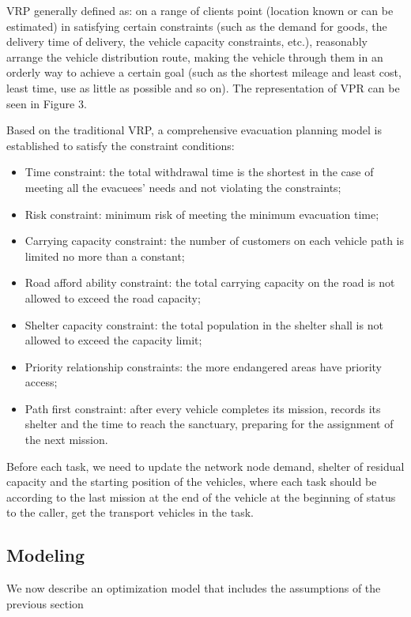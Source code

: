 \documentclass{mcmthesis}
\begin{document}
VRP \cite{Dikas2016Solving,He2015Model} generally defined as: on a range of clients point (location known or can be estimated) in satisfying certain constraints (such as the demand for goods, the delivery time of delivery, the vehicle capacity constraints, etc.), reasonably arrange the vehicle distribution route, making the vehicle through them in an orderly way to achieve a certain goal (such as the shortest mileage and least cost, least time, use as little as possible and so on). The representation of VPR can be seen in Figure 3.


Based on the traditional VRP, a comprehensive evacuation planning model is established to satisfy the constraint conditions:
\begin{itemize}
  \item Time constraint: the total withdrawal time is the shortest in the case of meeting all the evacuees' needs and not violating the constraints;
  \item Risk constraint: minimum risk of meeting the minimum evacuation time;
  \item Carrying capacity constraint: the number of customers on each vehicle path is limited no more than a constant;
  \item Road afford ability constraint: the total carrying capacity on the road is not allowed to exceed the road capacity;
  \item Shelter capacity constraint: the total population in the shelter shall is not allowed to exceed the capacity limit;
  \item Priority relationship constraints: the more endangered areas have priority access;
  \item Path first constraint: after every vehicle completes its mission, records its shelter and the time to reach the sanctuary, preparing for the assignment of the next mission.
\end{itemize}

Before each task, we need to update the network node demand, shelter of residual capacity and the starting position of the vehicles, where each task should be according to the last mission at the end of the vehicle at the beginning of status to the caller, get the transport vehicles in the task.

\subsection{Modeling}

We now describe an optimization model that includes the assumptions of the previous section %
\end{document}
